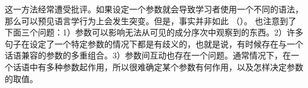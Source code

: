 这一方法经常遭受批评。如果设定一个参数就会导致学习者使用一个不同的语法，那么可以预见语言学行为上会发生突变。但是，事实并非如此 （\citealp[]{Bloom93a}）。 \citet[--344]{Fodor98a} 也注意到了下面三个问题：1）参数可以影响无法从可见的成分序次中观察到的东西。2）许多句子在设定了一个特定参数的情况下都是有歧义的，也就是说，有时候存在与一个话语兼容的参数的多重组合\citep{BN96a,Fodor98b}。3）参数间互动也存在一个问题。通常情况下，在一个话语中有多种参数起作用，所以很难确定某个参数有何作用，以及怎样决定参数的取值\nocite{Pullum83a}。

